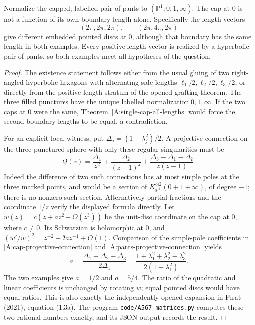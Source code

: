\begin{corollary}
\label{A:pants-cap-dependence}
Normalize the capped, labelled pair of pants to
$(\mathbb P^1;0,1,\infty)$. The cap at $0$ is not a function of
its own boundary length alone. Specifically the length vectors
\[
 (2\pi,2\pi,2\pi),\qquad(2\pi,4\pi,2\pi)
\]
give different embedded pointed discs at $0$, although that boundary
has the same length in both examples. Every positive length vector is
realized by a hyperbolic pair of pants, so both examples meet all
hypotheses of the question.
\end{corollary}

\begin{proof}
The existence statement follows either from the usual gluing of two
right-angled hyperbolic hexagons with alternating side lengths
$\ell_1/2,\ell_2/2,\ell_3/2$, or directly from the positive-length
stratum of the opened grafting theorem. The three filled punctures
have the unique labelled normalization $0,1,\infty$. If the two caps
at $0$ were the same, Theorem~\ref{A:single-cap-all-lengths} would
force the second boundary lengths to be equal, a contradiction.

For an explicit local witness, put
$\Delta_j=(1+\lambda_j^2)/2$. A projective connection on the
three-punctured sphere with only these regular singularities must be
\begin{equation}\label{A:pants-projective-connection}
 Q(z)=\frac{\Delta_1}{z^2}
      +\frac{\Delta_2}{(z-1)^2}
      +\frac{\Delta_3-\Delta_1-\Delta_2}{z(z-1)}.
\end{equation}
Indeed the difference of two such connections has at most simple
poles at the three marked points, and would be a section of
$K_{\mathbb P^1}^{\otimes2}(0+1+\infty)$, of degree $-1$;
there is no nonzero such section. Alternatively partial fractions
and the coordinate $1/z$ verify the displayed formula directly.
Let $w(z)=c(z+a z^2+O(z^3))$ be the unit-disc coordinate on the
cap at $0$, where $c\ne0$. Its Schwarzian is holomorphic at $0$,
and $(w'/w)^2=z^{-2}+2a z^{-1}+O(1)$.
Comparison of the simple-pole coefficients in
\eqref{A:cap-projective-connection} and
\eqref{A:pants-projective-connection} yields
\[
 a=\frac{\Delta_1+\Delta_2-\Delta_3}{2\Delta_1}
  =\frac{1+\lambda_1^2+\lambda_2^2-\lambda_3^2}
         {2(1+\lambda_1^2)}.
\]
The two examples give $a=1/2$ and $a=5/4$. The ratio of the
quadratic and linear coefficients is unchanged by rotating $w$;
equal pointed discs would have equal ratios. This is also exactly
the independently opened expansion in F\i rat (2021), equation
(1.3a). The program \texttt{code/A567\_matrices.py} computes these
two rational numbers exactly, and its JSON output records the result.
\end{proof}


